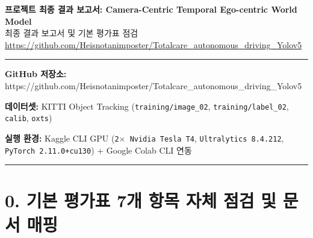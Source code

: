 \documentclass[10.5pt,a4paper]{article}
\begin{document}
\begin{center}
{\LARGE\bfseries 프로젝트 최종 결과 보고서: Camera-Centric Temporal Ego-centric World Model}\\[6pt]
{\normalsize\color{gray} 최종 결과 보고서 및 기본 평가표 점검}\\[4pt]
{\small\href{https://github.com/Heisnotanimposter/Totalcare_autonomous_driving_Yolov5}{https://github.com/Heisnotanimposter/Totalcare\_autonomous\_driving\_Yolov5}}
\end{center}
\vspace{4pt}
\hrule
\vspace{8pt}

\textbf{GitHub 저장소:} https:\allowbreak{}/\allowbreak{}/\allowbreak{}github.\allowbreak{}com/\allowbreak{}Heisnotanimposter/\allowbreak{}Totalcare\_\allowbreak{}autonomous\_\allowbreak{}driving\_\allowbreak{}Yolov5

\textbf{데이터셋:} KITTI Object Tracking (\texttt{training/\allowbreak{}image\_\allowbreak{}02}, \texttt{training/\allowbreak{}label\_\allowbreak{}02}, \texttt{calib}, \texttt{oxts})

\textbf{실행 환경:} Kaggle CLI GPU (\texttt{2$\times$ Nvidia Tesla T4}, \texttt{Ultralytics 8.\allowbreak{}4.\allowbreak{}212}, \texttt{PyTorch 2.\allowbreak{}11.\allowbreak{}0+cu130}) + Google Colab CLI 연동


\par\noindent\rule{\textwidth}{0.4pt}\par\medskip

\section{0. 기본 평가표 7개 항목 자체 점검 및 문서 매핑}
\end{document}
